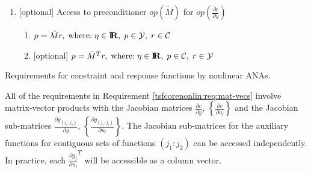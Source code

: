 \begin{table}
\begin{center}
{\begin{minipage}{\textwidth}
{\begin{enumerate}
Solutions of linear systems with $op\left(\frac{\partial c}{\partial y}\right)$ given a definitions of the norms
$||.||_{\mathcal{C}}$ and $||.||_{\mathcal{Y}}$:
  \begin{enumerate}
  \item\label{tsfcorenonlin:req:DcDy_solve}
  Solve for $p$ s.t.~$\frac{||\frac{\partial c}{\partial y} p - r||_{\mathcal{C}}}{O(||r||_{\mathcal{C}})} \le \eta,
  \; \mbox{where:}\; \eta\in\RE, \; p\in\mathcal{Y}, \; r\in\mathcal{C}$
  \item\label{tsfcorenonlin:req:DcDy_solve_adj}
  [optional] Solve for $p$ s.t.~$\frac{||\frac{\partial c}{\partial y}^T p - r||_{\mathcal{Y}}}{O(||r||_{\mathcal{Y}})} \le \eta,
  \; \mbox{where:}\; \eta\in\RE, \; p\in\mathcal{C}, \; r\in\mathcal{Y}$
  \end{enumerate}
\item\label{tsfcorenonlin:req:precond}
[optional] Access to preconditioner $op\left(\tilde{M}\right)$
for $op\left(\frac{\partial c}{\partial y}\right)$
  \begin{enumerate}
  \item\label{tsfcorenonlin:req:precond_solve}
  $p = \tilde{M} r, \; \mbox{where:}\; \eta\in\mbox{\textbf{I}}\hspace{-0.6ex}\mbox{\textbf{R}}, \; p\in\mathcal{Y}, \; r\in\mathcal{C}$
  \item\label{tsfcorenonlin:req:precond_solve_adj}
  [optional] $p = \tilde{M}^T r, \; \mbox{where:}\; \eta\in\mbox{\textbf{I}}\hspace{-0.6ex}\mbox{\textbf{R}}, \; p\in\mathcal{C}, \; r\in\mathcal{Y}$
  \end{enumerate}
\end{enumerate}
\esinglespace}
\end{minipage}
}%
\end{center}
\caption{
\label{tsfcorenonlin:tbl:requirements}
Requirements for constraint and response functions by nonlinear ANAs.
}
\end{table}
%
All of the requirements in Requirement \ref{tsfcorenonlin:req:mat-vecs} involve
matrix-vector products with the Jacobian matrices $\frac{\partial
c}{\partial y}$, $\left\{\frac{\partial c}{\partial u_l}\right\}$ and
the Jacobian sub-matrices $\frac{\partial g_{(j_1:j_2)}}{\partial y}$,
$\left\{\frac{\partial g_{(j_1:j_2)}}{\partial u_l}\right\}$.  The
Jacobian sub-matrices for the auxiliary functions for contiguous sets
of functions $(j_1:j_2)$ can be accessed independently.  In practice,
each $\frac{\partial g_{j}}{\partial u_l}^T$ will be accessible as a
column vector.  

